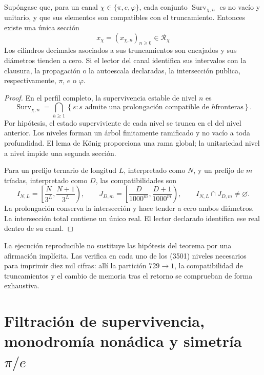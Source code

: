 \begin{theorem}
\label{thm:generacion-supervivencia-pi-e-phi-rev6}
Supóngase que, para un canal
\(\chi\in\{\pi,e,\varphi\}\), cada conjunto
\(\operatorname{Surv}_{\chi,n}\) es no vacío y unitario, y que sus elementos
son compatibles con el truncamiento. Entonces existe una única sección
\[
x_\chi=(x_{\chi,n})_{n\geq0}\in\mathcal R_\chi
\]
Los cilindros decimales asociados a sus truncamientos son encajados y sus
diámetros tienden a cero. Si el lector del canal identifica sus intervalos
con la clausura, la propagación o la autoescala declaradas, la intersección
publica, respectivamente, \(\pi\), \(e\) o \(\varphi\).
\end{theorem}

\begin{proof}
En el perfil completo, la supervivencia estable de nivel \(n\) es
\[
\operatorname{Surv}_{\chi,n}
=\bigcap_{h\geq1}
\left\{s:\text{\(s\) admite una prolongación compatible de \(h\)
fronteras}\right\}.
\]
Por hipótesis, el estado superviviente de cada nivel se trunca en el del
nivel anterior. Los niveles forman un árbol finitamente ramificado y no vacío
a toda profundidad. El lema de König proporciona una rama global; la
unitariedad nivel a nivel impide una segunda sección.

Para un prefijo ternario de longitud \(L\), interpretado como \(N\), y un
prefijo de \(m\) tríadas, interpretado como \(D\), las compatibilidades son
\[
I_{N,L}=\left[\frac{N}{3^L},\frac{N+1}{3^L}\right),
\qquad
J_{D,m}=\left[\frac{D}{1000^m},\frac{D+1}{1000^m}\right),
\qquad
I_{N,L}\cap J_{D,m}\ne\varnothing .
\]
La prolongación conserva la intersección y hace tender a cero ambos
diámetros. La intersección total contiene un único real. El lector declarado
identifica ese real dentro de su canal.
\end{proof}

La ejecución reproducible no sustituye las hipótesis del teorema por una
afirmación implícita. Las verifica en cada uno de los (3501) niveles
necesarios para imprimir diez mil cifras: allí la partición \(729\to1\), la
compatibilidad de truncamientos y el cambio de memoria tras el retorno se
comprueban de forma exhaustiva.

\section{Filtración de supervivencia, monodromía nonádica y simetría
\texorpdfstring{\(\pi/e\)}{pi/e}}


